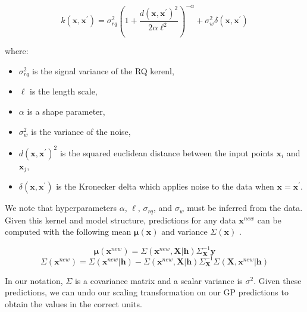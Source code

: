 \documentclass[journal=jacsat,manuscript=article]{achemso}
\begin{document}
\begin{equation}
    k(\mathbf{x},\mathbf{x}^{\prime}) = \sigma_{rq}^2 \left(1 + \frac{d(\mathbf{x}, \mathbf{x}^{\prime})^2}{2\alpha \ell^2}\right)^{-\alpha} + \sigma_w^2\delta(\mathbf{x}, \mathbf{x}^{\prime})
    \label{kernel_final}
\end{equation}

\noindent where:
\begin{itemize}
  \item \( \sigma_{rq}^2 \) is the signal variance of the RQ kerenl,
  \item \( \ell \) is the length scale,
  \item \( \alpha \) is a shape parameter,
  \item \( \sigma_w^2 \) is the variance of the noise,
  \item \( d(\mathbf{x}, \mathbf{x}^{\prime})^2 \) is the squared euclidean distance between the input points \( \mathbf{x}_i \) and \( \mathbf{x}_j \),
  \item \( \delta(\mathbf{x}, \mathbf{x}^{\prime}) \) is the Kronecker delta which applies noise to the data when \( \mathbf{x} = \mathbf{x}^{\prime} \).
\end{itemize}

We note that hyperparameters $\alpha$, $\ell$, $\sigma_{rq}$, and $\sigma_{w}$ must be inferred from the data. Given this kernel and model structure, predictions for any data $\mathbf{x}^{new}$ can be computed with the following mean $\boldsymbol{\mu}(\mathbf{x})$ and variance $\Sigma(\mathbf{x})$ \cite{Gramacy2020Surrogates:Sciences}.

\begin{equation}
\boldsymbol{\mu}(\mathbf{x}^{new}) = \Sigma{(\mathbf{x}^{new},\mathbf{X}\vert \mathbf{h})} \Sigma_{\mathbf{X}}^{-1} \mathbf{\mathbf{y}}
\end{equation}
\begin{equation}
\Sigma(\mathbf{x}^{new}) = \Sigma(\mathbf{x}^{new} \vert \mathbf{h}) - \Sigma(\mathbf{x}^{new},\mathbf{X} \vert \mathbf{h}) \Sigma_{\mathbf{X}}^{-1} \Sigma(\mathbf{X},\mathbf{x}^{new}\vert \mathbf{h})
\end{equation}

In our notation, $\Sigma$ is a covariance matrix and a scalar variance is $\sigma^2$. Given these predictions, we can undo our scaling transformation on our GP predictions to obtain the values in the correct units.
\end{document}
